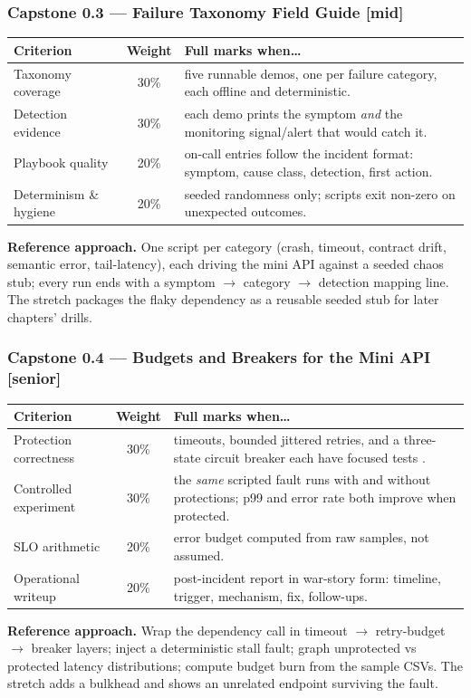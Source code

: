 \subsubsection*{Capstone 0.3 --- Failure Taxonomy Field Guide [mid]}
\begin{center}\small
\begin{tabularx}{\textwidth}{l c X}
\toprule
\textbf{Criterion} & \textbf{Weight} & \textbf{Full marks when\ldots} \\
\midrule
Taxonomy coverage & 30\% & five runnable demos, one per failure category, each offline and deterministic. \\
Detection evidence & 30\% & each demo prints the symptom \emph{and} the monitoring signal/alert that would catch it. \\
Playbook quality & 20\% & on-call entries follow the incident format: symptom, cause class, detection, first action. \\
Determinism \& hygiene & 20\% & seeded randomness only; scripts exit non-zero on unexpected outcomes. \\
\bottomrule
\end{tabularx}
\end{center}
\textbf{Reference approach.} One script per category (crash, timeout,
contract drift, semantic error, tail-latency), each driving the mini API
against a seeded chaos stub; every run ends with a symptom $\to$ category
$\to$ detection mapping line. The stretch packages the flaky dependency as a
reusable seeded stub for later chapters' drills.

\subsubsection*{Capstone 0.4 --- Budgets and Breakers for the Mini API [senior]}
\begin{center}\small
\begin{tabularx}{\textwidth}{l c X}
\toprule
\textbf{Criterion} & \textbf{Weight} & \textbf{Full marks when\ldots} \\
\midrule
Protection correctness & 30\% & timeouts, bounded jittered retries, and a three-state circuit breaker each have focused tests \cite{nygard2018releaseit}. \\
Controlled experiment & 30\% & the \emph{same} scripted fault runs with and without protections; p99 and error rate both improve when protected. \\
SLO arithmetic & 20\% & error budget computed from raw samples, not assumed. \\
Operational writeup & 20\% & post-incident report in war-story form: timeline, trigger, mechanism, fix, follow-ups. \\
\bottomrule
\end{tabularx}
\end{center}
\textbf{Reference approach.} Wrap the dependency call in timeout
$\to$ retry-budget $\to$ breaker layers; inject a deterministic stall fault;
graph unprotected vs protected latency distributions; compute budget burn
from the sample CSVs. The stretch adds a bulkhead and shows an unrelated
endpoint surviving the fault.

